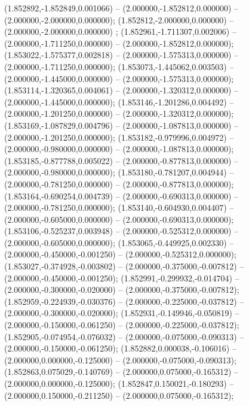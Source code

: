  (1.852892,-1.852849,0.001066) -- (2.000000,-1.852812,0.000000) -- (2.000000,-2.000000,0.000000);
 (1.852812,-2.000000,0.000000) -- (2.000000,-2.000000,0.000000) ;
 (1.852961,-1.711307,0.002006) -- (2.000000,-1.711250,0.000000) -- (2.000000,-1.852812,0.000000);
 (1.853022,-1.575377,0.002818) -- (2.000000,-1.575313,0.000000) -- (2.000000,-1.711250,0.000000);
 (1.853073,-1.445062,0.003503) -- (2.000000,-1.445000,0.000000) -- (2.000000,-1.575313,0.000000);
 (1.853114,-1.320365,0.004061) -- (2.000000,-1.320312,0.000000) -- (2.000000,-1.445000,0.000000);
 (1.853146,-1.201286,0.004492) -- (2.000000,-1.201250,0.000000) -- (2.000000,-1.320312,0.000000);
 (1.853169,-1.087829,0.004796) -- (2.000000,-1.087813,0.000000) -- (2.000000,-1.201250,0.000000);
 (1.853182,-0.979996,0.004972) -- (2.000000,-0.980000,0.000000) -- (2.000000,-1.087813,0.000000);
 (1.853185,-0.877788,0.005022) -- (2.000000,-0.877813,0.000000) -- (2.000000,-0.980000,0.000000);
 (1.853180,-0.781207,0.004944) -- (2.000000,-0.781250,0.000000) -- (2.000000,-0.877813,0.000000);
 (1.853164,-0.690254,0.004739) -- (2.000000,-0.690313,0.000000) -- (2.000000,-0.781250,0.000000);
 (1.853140,-0.604930,0.004407) -- (2.000000,-0.605000,0.000000) -- (2.000000,-0.690313,0.000000);
 (1.853106,-0.525237,0.003948) -- (2.000000,-0.525312,0.000000) -- (2.000000,-0.605000,0.000000);
 (1.853065,-0.449925,0.002330) -- (2.000000,-0.450000,-0.001250) -- (2.000000,-0.525312,0.000000);
 (1.853027,-0.374928,-0.003802) -- (2.000000,-0.375000,-0.007812) -- (2.000000,-0.450000,-0.001250);
 (1.852991,-0.299932,-0.014704) -- (2.000000,-0.300000,-0.020000) -- (2.000000,-0.375000,-0.007812);
 (1.852959,-0.224939,-0.030376) -- (2.000000,-0.225000,-0.037812) -- (2.000000,-0.300000,-0.020000);
 (1.852931,-0.149946,-0.050819) -- (2.000000,-0.150000,-0.061250) -- (2.000000,-0.225000,-0.037812);
 (1.852905,-0.074954,-0.076032) -- (2.000000,-0.075000,-0.090313) -- (2.000000,-0.150000,-0.061250);
 (1.852882,0.000038,-0.106016) -- (2.000000,0.000000,-0.125000) -- (2.000000,-0.075000,-0.090313);
 (1.852863,0.075029,-0.140769) -- (2.000000,0.075000,-0.165312) -- (2.000000,0.000000,-0.125000);
 (1.852847,0.150021,-0.180293) -- (2.000000,0.150000,-0.211250) -- (2.000000,0.075000,-0.165312);
